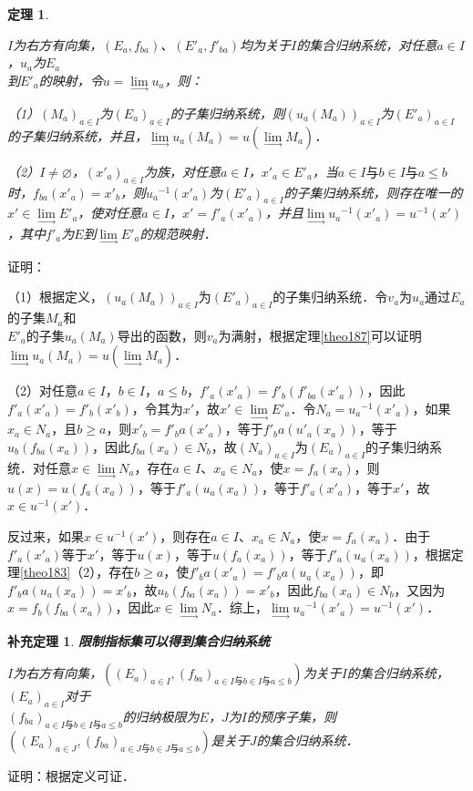 \documentclass[12pt, a4paper, oneside]{book}
\newtheorem{theo}{定理}
\newtheorem{cor}{补充定理}
\begin{document}
			\begin{theo}\label{theo188}
				\hfill\par
				$I$为右方有向集，$(E_a, f_{ba})$、$({E'}_a, {f'}_{ba})$均为关于$I$的集合归纳系统，对任意$a\in I$，$u_a$为$E_a$\\到${E'}_a$的映射，令$u=\lim\limits_\to u_a$，则：
				\par
				（1）$(M_a)_{a\in I}$为$(E_a)_{a\in I}$的子集归纳系统，则$(u_a (M_a))_{a\in I}$为$({E'}_a)_{a\in I}$的子集归纳系统，并且，$\lim\limits_\to u_a(M_a)=u(\lim\limits_\to M_a)$．
				\par
				（2）$I\neq \varnothing$，$({x'}_a)_{a\in I}$为族，对任意$a\in I$，${x'}_a\in {E'}_a$，当$a\in I\text{与}b\in I\text{与}a\leq b$时，$f_{ba}({x'}_a)={x'}_b$，则${u_a}^{-1}({x'}_a)$为$({E'}_a)_{a\in I}$的子集归纳系统，则存在唯一的$x'\in \lim\limits_\to {E'}_a$，使对任意$a\in I$，$x'={f'}_a({x'}_a)$，并且$\lim\limits_\to {u_a}^{-1}({x'}_a)=u^{-1}(x')$，其中${f'}_a$为$E$到$\lim\limits_\to {E'}_a$的规范映射．				
			\end{theo}
			证明：
			\par
			（1）根据定义，$(u_a (M_a))_{a\in I}$为$({E'}_a)_{a\in I}$的子集归纳系统．令$v_a$为$u_a$通过$E_a$的子集$M_a$和\\${E'}_a$的子集$u_a(M_a)$导出的函数，则$v_a$为满射，根据定理\ref{theo187}可以证明$\lim\limits_\to u_a(M_a)=u(\lim\limits_\to M_a)$．
			\par
			（2）对任意$a\in I$，$b\in I$，$a\leq b$，${f'}_a({x'}_a)={f'}_b({f'}_{ba}({x'}_a))$，因此${f'}_a({x'}_a)={f'}_b({x'}_b)$，令其为$x'$，故$x' \in \lim\limits_\to {E'}_a$．令$N_a={u_a}^{-1}({x'}_a)$，如果$x_a\in N_a$，且$b\geq a$，则${x'}_b={f'}_ba({x'}_a)$，等于${f'}_ba({u'}_a(x_a))$，等于$u_b(f_{ba}(x_a))$，因此$f_{ba}(x_a)\in N_b$，故$(N_a)_{a\in I}$为$(E_a)_{a\in I}$的子集归纳系统．对任意$x\in \lim\limits_\to N_a$，存在$a\in I$、$x_a\in N_a$，使$x=f_a(x_a)$，则$u(x)=u(f_a(x_a))$，等于${f'}_a(u_a(x_a))$，等于${f'}_a({x'}_a)$，等于$x'$，故$x\in u^{-1}(x')$．
			\par
			反过来，如果$x\in u^{-1}(x')$，则存在$a\in I$、$x_a\in N_a$，使$x=f_a(x_a)$．由于${f'}_a({x'}_a)$等于$x'$，等于$u(x)$，等于$u(f_a(x_a))$，等于${f'}_a(u_a(x_a))$，根据定理\ref{theo183}（2），存在$b\geq a$，使${f'}_ba({x'}_a)= {f'}_ba(u_a(x_a))$，即${f'}_ba(u_a(x_a))={x'}_b$，故$u_b(f_{ba}(x_a))={x'}_b$，因此$f_{ba}(x_a)\in N_b$，又因为$x=f_b(f_{ba}(x_a))$，因此$x\in \lim\limits_\to N_a$．综上，$\lim\limits_\to {u_a}^{-1}({x'}_a)=u^{-1}(x')$．
			
			\begin{cor}\label{cor429}
				\textbf{限制指标集可以得到集合归纳系统}
				\par
				$I$为右方有向集，$((E_a)_{a\in I}, (f_{ba})_{a\in I\text{与}b\in I\text{与}a\leq b})$为关于$I$的集合归纳系统，$(E_a)_{a\in I}$对于\\$(f_{ba})_{a\in I\text{与}b\in I\text{与}a\leq b}$的归纳极限为$E$，$J$为$I$的预序子集，则$((E_a)_{a\in J}, (f_{ba})_{a\in J\text{与}b\in J\text{与}a\leq b})$是关于$J$的集合归纳系统．
			\end{cor}
			证明：根据定义可证．
			
\end{document}
